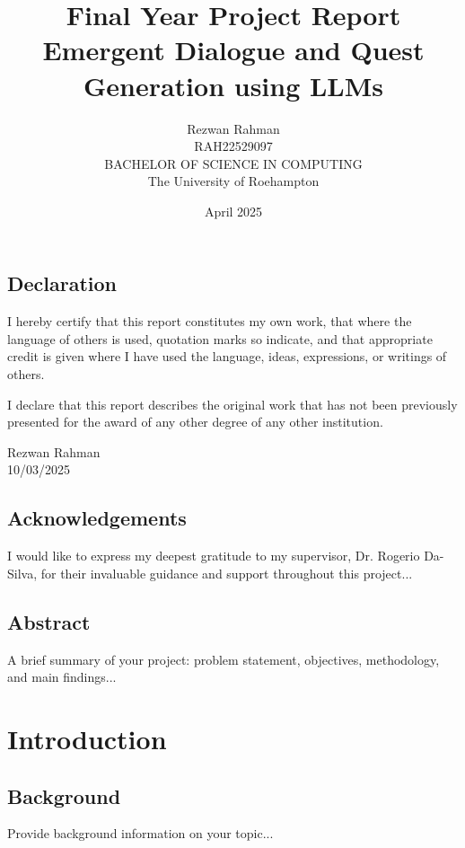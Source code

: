\documentclass[a4paper,12pt]{report}
\title{
    \vspace{2in}
    \textbf{Final Year Project Report}\\
    \Large Emergent Dialogue and Quest Generation using LLMs
    \vfill
}
\author{
    Rezwan Rahman \\
    RAH22529097 \\
    BACHELOR OF SCIENCE IN COMPUTING \\
    The University of Roehampton \\
    \date{April 2025}
}
\date{}
\begin{document}
\maketitle
\newpage

\begingroup
\section*{Declaration}
I hereby certify that this report constitutes my own work, that where the language of others is used, quotation marks so indicate, and that appropriate credit is given where I have used the language, ideas, expressions, or writings of others. 
\vspace{1em}
\setlength{\parindent}{0pt}

I declare that this report describes the original work that has not been previously presented for the award of any other degree of any other institution.



\begin{flushright}
    Rezwan Rahman \\
    10/03/2025
\end{flushright}
\endgroup

\newpage

\section*{Acknowledgements}
I would like to express my deepest gratitude to my supervisor, Dr. Rogerio Da-Silva, for their invaluable guidance and support throughout this project...

\newpage

\section*{Abstract}
A brief summary of your project: problem statement, objectives, methodology, and main findings...

\newpage

\tableofcontents
\newpage


\chapter{Introduction}
\section{Background}
Provide background information on your topic...
\end{document}
